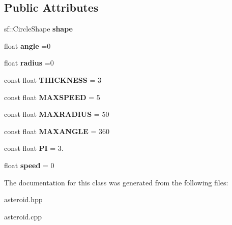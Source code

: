 \subsection*{Public Attributes}
\begin{DoxyCompactItemize}
\item 
\mbox{\label{classasteroid_ac5224c1e7ea4fda70237fd145abbd2b7}} 
sf\+::\+Circle\+Shape {\bfseries shape}
\item 
\mbox{\label{classasteroid_a5e9eef7b7959338985417e4af074766e}} 
float {\bfseries angle} =0
\item 
\mbox{\label{classasteroid_a9cfb8bd37d4a65198ac3f9f9158cc584}} 
float {\bfseries radius} =0
\item 
\mbox{\label{classasteroid_a68d1ba0b8acbcb688f49190bd19a7a7e}} 
const float {\bfseries T\+H\+I\+C\+K\+N\+E\+SS} = 3
\item 
\mbox{\label{classasteroid_abe362ddce331156a92ee7c7d848fb07c}} 
const float {\bfseries M\+A\+X\+S\+P\+E\+ED} = 5
\item 
\mbox{\label{classasteroid_a52b0e374bdd222e533b1ea183b1986d0}} 
const float {\bfseries M\+A\+X\+R\+A\+D\+I\+US} = 50
\item 
\mbox{\label{classasteroid_a36ef846f482b3252674013e7855225d1}} 
const float {\bfseries M\+A\+X\+A\+N\+G\+LE} = 360
\item 
\mbox{\label{classasteroid_a898acd298abfaaebef16b7b796d18db5}} 
const float {\bfseries PI} = 3.
\item 
\mbox{\label{classasteroid_a724b944f732c72b57c78e3e53bf80399}} 
float {\bfseries speed} = 0
\end{DoxyCompactItemize}


The documentation for this class was generated from the following files\+:\begin{DoxyCompactItemize}
\item 
asteroid.\+hpp\item 
asteroid.\+cpp\end{DoxyCompactItemize}
